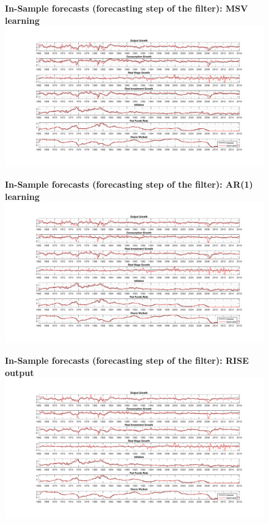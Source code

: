 \documentclass[12pt,reqno]{article}
\numberwithin{equation}{section}
\begin{document}
\begin{figure}[H]
\textbf{In-Sample forecasts (forecasting step of the filter): MSV learning}\\
\includegraphics[height=\textheight,width=\textwidth]{sw_msv_forecast_errors.pdf}
\end{figure}

\begin{figure}[H]
\textbf{In-Sample forecasts (forecasting step of the filter): AR(1) learning}\\
\includegraphics[height=\textheight,width=\textwidth]{sw_ar1_forecast_errors.pdf}
\end{figure}

\begin{figure}[H]
\textbf{In-Sample forecasts (forecasting step of the filter): RISE output}\\
\includegraphics[height=\textheight,width=\textwidth]{rise_forecast_errors.pdf}
\end{figure}
\end{document}
